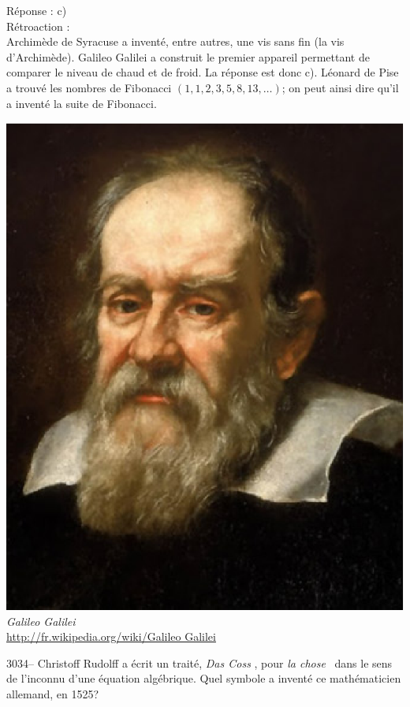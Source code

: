 \documentclass[letterpaper, 12pt]{article}
\begin{document}
R\'eponse : c)\\

R\'etroaction :\\
Archim\`ede de Syracuse a invent\'e, entre autres, une vis sans fin (la vis d'Archim\`ede). Galileo Galilei a construit le premier appareil permettant de comparer le niveau de chaud et de froid. La r\'eponse est donc c). L\'eonard de Pise a trouv\'e les nombres de Fibonacci $(1,1,2,3,5,8,13, \dots)$; on peut ainsi dire qu'il a invent\'e la suite de Fibonacci.\\

\begin{center}
\includegraphics[scale=0.25]{Galilee.eps}\\
\emph{{\small Galileo Galilei}}\\
\href{http://fr.wikipedia.org/wiki/Galileo Galilei}{http://fr.wikipedia.org/wiki/Galileo Galilei}\\[5mm]
\end{center}



3034-- Christoff Rudolff a \'ecrit un trait\'e, \og \emph{Das Coss} \fg, pour \og \emph{la chose} \fg \ dans le sens de l'inconnu d'une \'equation alg\'ebrique. Quel symbole a invent\'e ce math\'ematicien allemand, en 1525?\\
\end{document}
